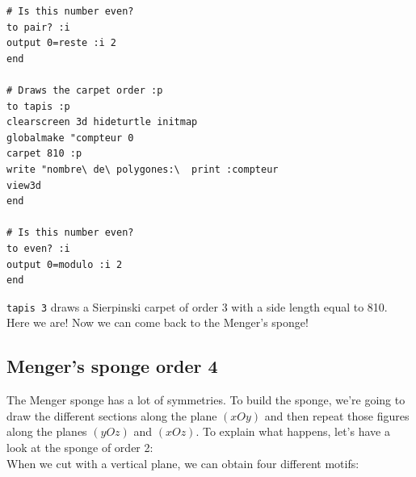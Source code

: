 \begin{verbatim}
# Is this number even?
to pair? :i
output 0=reste :i 2
end

# Draws the carpet order :p
to tapis :p
clearscreen 3d hideturtle initmap
globalmake "compteur 0
carpet 810 :p
write "nombre\ de\ polygones:\  print :compteur 
view3d
end

# Is this number even?
to even? :i
output 0=modulo :i 2
end

\end{verbatim}
\texttt{tapis 3} draws a Sierpinski carpet of order 3 with a side length equal to 810. Here we are! Now we can come back to the Menger's sponge!
\subsection{Menger's sponge order 4}
The Menger sponge has a lot of symmetries. To build the sponge, we're going to draw the different sections along the plane $(xOy)$ and then repeat those figures along the planes $(yOz)$ and $(xOz)$. To explain what happens, let's have a look at the sponge of order 2:\\
When we cut with a vertical plane, we can obtain four different motifs:\\
